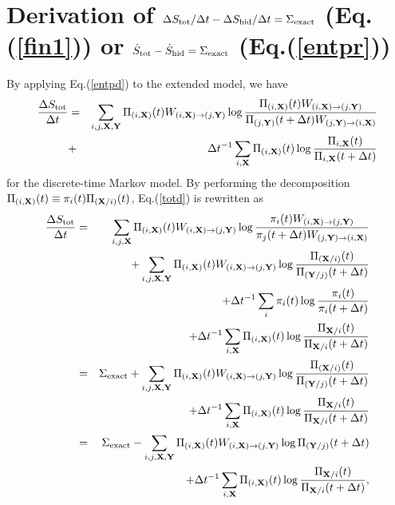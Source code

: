 \documentclass[aps,pre,amsmath,amssymb,floatfix,preprint,nofootinbib]{revtex4}
\begin{document}
\section{Derivation of ${\Delta S_{\rm tot}}/{\Delta t} - {\Delta S_{\rm hid}}/{\Delta t} = \Sigma_{\rm exact}$ (Eq.(\ref{fin1})) or $\dot S_{\rm tot} - \dot S_{\rm hid} = \Sigma_{\rm exact}$ (Eq.(\ref{entpr}))}\label{totsig}
By applying Eq.(\ref{entpd}) to the extended model, we have
\begin{eqnarray}
\frac{\Delta S_{\rm tot}}{\Delta t}
&=&   \sum_{i,j,{\bf X},{\bf Y}}  \Pi_{(i,{\bf X})}(t) W_{(i,{\bf X}) \to (j,{\bf Y})} \log \frac{\Pi_{(i,{\bf X})}(t ) W_{(i,{\bf X}) \to (j,{\bf Y})}}{\Pi_{(j,{\bf Y})}(t+ \Delta t) W_{(j,{\bf Y}) \to (i,{\bf X})}}\nonumber\\
&+& \Delta t^{-1} \sum_{i,{\bf X} } \Pi_{(i,{\bf X})}(t)  \log \frac{\Pi_{i,{\bf X}}(t) }{\Pi_{i,{\bf X}}(t+ \Delta t)}\label{totd}
\end{eqnarray} 
for the discrete-time Markov model. By performing the decomposition $\Pi_{(i,{\bf X})}(t) \equiv \pi_i (t) \Pi_{({\bf X}/i)}(t)$, Eq.(\ref{totd}) is rewritten as
\begin{eqnarray}
\frac{\Delta S_{\rm tot}}{\Delta t}
&=&  \sum_{i,j,{\bf X}}  \Pi_{(i,{\bf X})}(t) W_{(i,{\bf X}) \to (j,{\bf Y})} \log \frac{\pi_{i}(t) W_{(i,{\bf X}) \to (j,{\bf Y})}}{\pi_{j}(t+ \Delta t) W_{(j,{\bf Y}) \to (i,{\bf X})}} \nonumber\\
&&+ \sum_{i,j,{\bf X},{\bf Y}} \Pi_{(i,{\bf X})}(t) W_{(i,{\bf X}) \to (j,{\bf Y})}  \log \frac{\Pi_{({\bf X}/i)}(t)}{\Pi_{({\bf Y}/j)}(t+ \Delta t)} \nonumber\\
&&+ \Delta t^{-1} \sum_{i } \pi_{i}(t)  \log \frac{\pi_{i}(t) }{\pi_{i}(t+ \Delta t)}
\nonumber\\
&&+ \Delta t^{-1}\sum_{i,{\bf X} } \Pi_{(i,{\bf X})}(t)  \log \frac{\Pi_{{\bf X}/i}(t) }{\Pi_{{\bf X}/i}(t+ \Delta t)}\nonumber\\
&=&  \Sigma_{\rm exact} +  \sum_{i,j,{\bf X},{\bf Y}} \Pi_{(i,{\bf X})}(t) W_{(i,{\bf X}) \to (j,{\bf Y})} \log \frac{\Pi_{({\bf X}/i)}(t) }{\Pi_{({\bf Y}/j)}(t+ \Delta t)}\nonumber\\
&&+ \Delta t^{-1}\sum_{i,{\bf X} } \Pi_{(i,{\bf X})}(t)  \log \frac{\Pi_{{\bf X}/i}(t) }{\Pi_{{\bf X}/i}(t+ \Delta t)}\nonumber\\
&=&  \Sigma_{\rm exact} -  \sum_{i,j,{\bf X},{\bf Y}} \Pi_{(i,{\bf X})}(t) W_{(i,{\bf X}) \to (j,{\bf Y})} \log \Pi_{({\bf Y}/j)}(t+ \Delta t)\nonumber\\
&&+ \Delta t^{-1}\sum_{i,{\bf X} } \Pi_{(i,{\bf X})}(t)  \log \frac{\Pi_{{\bf X}/i}(t) }{\Pi_{{\bf X}/i}(t+ \Delta t)},
\label{apph1}
\end{eqnarray} 
\end{document}
